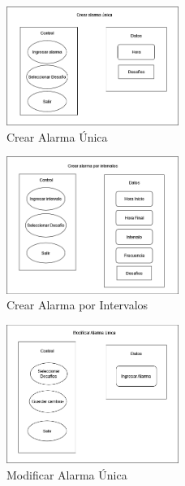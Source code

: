 \begin{figure}[H]
	\centering
	\includegraphics[width=0.5\textwidth]{./img/componentes/02-CrearAlarmaUnica.png}
	\caption{Crear Alarma Única}
        \vspace{5pt}
	\label{fig:Crear Alarma Única}
\end{figure}

\begin{figure}[H]
	\centering
	\includegraphics[width=0.5\textwidth]{./img/componentes/03-CrearAlarmaPorIntervalos.png}
	\caption{Crear Alarma por Intervalos}
        \vspace{5pt}
	\label{fig:Crear Alarma por Intervalos}
\end{figure}

\begin{figure}[H]
	\centering
	\includegraphics[width=0.5\textwidth]{./img/componentes/04-ModificarAlarmaUnica.png}
	\caption{Modificar Alarma Única}
        \vspace{5pt}
	\label{fig:Modificar Alarma Única}
\end{figure}

